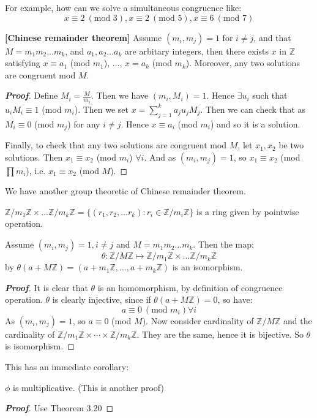 For example, how can we solve a simultaneous congruence like:
\begin{equation*} x \equiv 2~(\text{mod } 3), x \equiv 2~(\text{mod } 5), x \equiv 6~(\text{mod } 7)
\end{equation*}
\begin{theorem}{\bf [Chinese remainder theorem]}\label{C;CRT} Assume $(m_i,m_j)=1$ for $i \neq j$, and that $M=m_1m_2 \ldots m_k$, and $a_1, a_2 \ldots a_k$ are arbitary integers, then there exists $x$ in $\mathbb{Z}$ satisfying $x \equiv a_1$ (mod $m_1$), $\ldots$, $x=a_k$ (mod $m_k$). Moreover, any two solutions are congruent mod $M$.
\end{theorem}
\begin{proof}[\bf Proof] Define $M_i=\frac{M}{m_i}$. Then we have $(m_i,M_i)=1$. Hence $\exists u_i$ such that $u_i M_i \equiv 1$ (mod $m_i$). Then we set $x=\sum_{j=1}^{k}a_ju_jM_j$. Then we can check that as $M_i \equiv 0$ (mod $m_j$) for any $i \neq j$. Hence $x \equiv a_i$ (mod $m_i$) and so it is a solution.

Finally, to check that any two solutions are congruent mod $M$, let $x_1,x_2$ be two solutions. Then $x_1 \equiv x_2$ (mod $m_i$) $\forall i$. And as $(m_i,m_j)=1$, so $x_1 \equiv x_2$ (mod $\prod m_i$), i.e. $x_1 \equiv x_2$ (mod $M$).
\end{proof}
We have another group theoretic of Chinese remainder theorem.
\begin{definition} $\mathbb{Z}/m_1\mathbb{Z} \times \ldots \mathbb{Z}/m_k\mathbb{Z} =\{(r_1, r_2,\ldots r_k): r_i \in \mathbb{Z}/m_i\mathbb{Z}\}$ is a ring given by pointwise operation.
\end{definition}
\begin{theorem} Assume $(m_i,m_j)=1, i \neq j$ and $M=m_1m_2 \ldots m_k$. Then the map:
\begin{equation*} \theta: \mathbb{Z}/M\mathbb{Z} \longmapsto \mathbb{Z}/m_1\mathbb{Z} \times \ldots \mathbb{Z}/m_k\mathbb{Z}
\end{equation*}
by $\theta(a+M\mathbb{Z})=(a+m_1\mathbb{Z}, \ldots,a+m_k\mathbb{Z})$ is an isomorphism.
\end{theorem}
\begin{proof}[\bf Proof] It is clear that $\theta$ is an homomorphism, by definition of congruence operation. $\theta$ is clearly injective, since if $\theta(a+M\mathbb{Z})=0$, so have:
\begin{equation*} a \equiv 0~(\text{mod } m_i) \forall i \end{equation*}
As $(m_i,m_j)=1$, so $a \equiv 0$ (mod $M$). Now consider cardinality of $\mathbb{Z}/M\mathbb{Z}$ and the cardinality of $\mathbb{Z}/m_1\mathbb{Z} \times \cdots \times \mathbb{Z}/m_k\mathbb{Z}$. They are the same, hence it is bijective. So $\theta$ is isomorphism.
\end{proof}
This has an immediate corollary:
\begin{corollary} $\phi$ is multiplicative. (This is another proof)
\end{corollary}
\begin{proof}[\bf Proof] Use Theorem 3.20
\end{proof}
